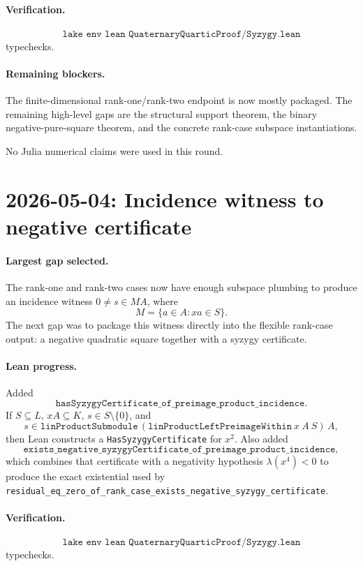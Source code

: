 \documentclass[11pt]{article}
\begin{document}
\paragraph{Verification.}
\[
\texttt{lake env lean QuaternaryQuarticProof/Syzygy.lean}
\]
typechecks.

\paragraph{Remaining blockers.}
The finite-dimensional rank-one/rank-two endpoint is now mostly packaged.
The remaining high-level gaps are the structural support theorem, the binary
negative-pure-square theorem, and the concrete rank-case subspace
instantiations.

No Julia numerical claims were used in this round.

\section*{2026-05-04: Incidence witness to negative certificate}

\paragraph{Largest gap selected.}
The rank-one and rank-two cases now have enough subspace plumbing to produce
an incidence witness \(0\neq s\in M A\), where
\[
M=\{a\in A:xa\in S\}.
\]
The next gap was to package this witness directly into the flexible rank-case
output: a negative quadratic square together with a syzygy certificate.

\paragraph{Lean progress.}
Added
\[
\texttt{hasSyzygyCertificate\_of\_preimage\_product\_incidence}.
\]
If \(S\subseteq L\), \(xA\subseteq K\), \(s\in S\setminus\{0\}\), and
\[
s\in \texttt{linProductSubmodule}\,
  (\texttt{linProductLeftPreimageWithin}\ x\ A\ S)\,A,
\]
then Lean constructs a \texttt{HasSyzygyCertificate} for \(x^2\).
Also added
\[
\texttt{exists\_negative\_syzygyCertificate\_of\_preimage\_product\_incidence},
\]
which combines that certificate with a negativity hypothesis
\(\lambda(x^4)<0\) to produce the exact existential used by
\texttt{residual\_eq\_zero\_of\_rank\_case\_exists\_negative\_syzygy\_certificate}.

\paragraph{Verification.}
\[
\texttt{lake env lean QuaternaryQuarticProof/Syzygy.lean}
\]
typechecks.
\end{document}
